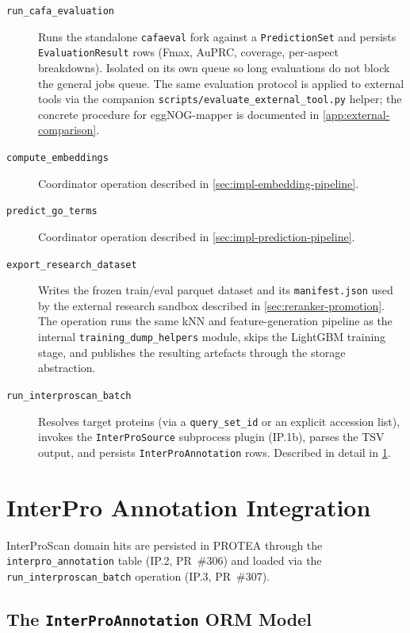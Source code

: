 \begin{description}
  \item[\texttt{run\_cafa\_evaluation}] Runs the standalone \texttt{cafaeval}
    fork against a \texttt{PredictionSet} and persists \texttt{EvaluationResult}
    rows (Fmax, AuPRC, coverage, per-aspect breakdowns). Isolated on its own
    queue so long evaluations do not block the general jobs queue. The same
    evaluation protocol is applied to external tools via the companion
    \texttt{scripts/evaluate\_external\_tool.py} helper; the concrete
    procedure for eggNOG-mapper is documented in \cref{app:external-comparison}.
  \item[\texttt{compute\_embeddings}] Coordinator operation described in
    \cref{sec:impl-embedding-pipeline}.
  \item[\texttt{predict\_go\_terms}] Coordinator operation described in
    \cref{sec:impl-prediction-pipeline}.
  \item[\texttt{export\_research\_dataset}] Writes the frozen train/eval
    parquet dataset and its \texttt{manifest.json} used by the external
    research sandbox described in \cref{sec:reranker-promotion}. The operation
    runs the same kNN and feature-generation pipeline as the internal
    \texttt{training\_dump\_helpers} module, skips the LightGBM training stage,
    and publishes the resulting artefacts through the storage abstraction.
  \item[\texttt{run\_interproscan\_batch}] Resolves target proteins (via
    a \texttt{query\_set\_id} or an explicit accession list), invokes the
    \texttt{InterProSource} subprocess plugin (IP.1b), parses the TSV output,
    and persists \texttt{InterProAnnotation} rows. Described in detail in
    \cref{sec:interpro-integration}.
\end{description}
\endgroup

\section{InterPro Annotation Integration}
\label{sec:interpro-integration}

InterProScan domain hits are persisted in PROTEA through the \texttt{interpro\_annotation}
table (IP.2, PR~\#306) and loaded via the \texttt{run\_interproscan\_batch} operation
(IP.3, PR~\#307).

\subsection{The \texttt{InterProAnnotation} ORM Model}
\label{subsec:interpro-orm}

